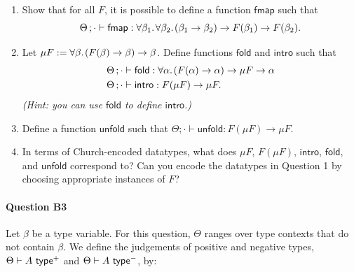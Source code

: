 \documentclass[11pt,a4paper,twoside]{article}
\begin{document}
\begin{enumerate}[label=(\alph*)]
  \item Show that for all $F$, it is possible to define a function
    $\mathsf{fmap}$ such that
    \[ \Theta \, ; \cdot \vdash \mathsf{fmap} :
      \forall \beta_1 .\;\! \forall \beta_2 .\;\! (\beta_1 \to \beta_2) \to
    F(\beta_1) \to F(\beta_2). \]

  \item Let $\mu F := \forall \beta .\;\! (F(\beta) \to \beta) \to \beta$.
    Define functions $\mathsf{fold}$ and $\mathsf{intro}$ such that
    \begin{align*}
      \Theta \, ; \cdot &\vdash \mathsf{fold}  :
      \forall \alpha .\;\! (F(\alpha) \to \alpha) \to \mu F \to \alpha \\
      \Theta \, ; \cdot &\vdash \mathsf{intro} : F(\mu F) \to \mu F.
    \end{align*}
    \emph{(Hint: you can use $\mathsf{fold}$ to define $\mathsf{intro}$.)}

  \item Define a function $\mathsf{unfold}$ such that
    $\Theta \semicolon \cdot \vdash \mathsf{unfold} : F (\mu F) \to \mu F$.

  \item In terms of Church-encoded datatypes, what does $\mu F$,
    $F(\mu F)$, $\mathsf{intro}$, $\mathsf{fold}$, and
    $\mathsf{unfold}$ correspond to? Can you encode the datatypes in
    Question 1 by choosing appropriate instances of $F$?
\end{enumerate}

\paragraph{Question B3} Let $\beta$ be a type variable.
For this question, $\Theta$ ranges over type contexts that do not
contain $\beta$.
We define the judgements of positive and negative types,
$\Theta \vdash A\ \mathsf{type}^+$ and $\Theta \vdash A\ \mathsf{type}^-$, by:
\end{document}
